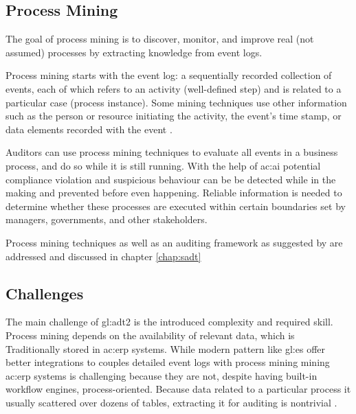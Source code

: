 

\subsection{Process Mining}\label{sec:psmin}

The goal of process mining is to discover, monitor, and improve real (not assumed) processes by extracting knowledge from event logs. 

Process mining starts with the event log: a sequentially recorded collection of events, each of which refers to an activity (well-defined step) and is related to a particular case (process instance). Some mining techniques use other information such as the person or resource initiating the activity, the event's time stamp, or data elements recorded with the event \citep{5427384}.

Auditors can use process mining techniques to evaluate all events in a business process, and do so while it is still running. With the help of \gls{ac:ai} potential compliance violation and suspicious behaviour can be be detected while in the making and prevented before even happening. Reliable information is needed to determine whether these processes are executed within certain boundaries set by managers, governments, and other stakeholders. 

Process mining techniques as well as an auditing framework as suggested by \citep{5427384} are addressed and discussed in chapter \ref{chap:sadt}

\subsection{Challenges}


The main challenge of \gls{gl:adt2} is the introduced complexity and required skill. Process mining depends on the availability of relevant data, which is Traditionally stored in \gls{ac:erp} systems. While modern pattern like \gls{gl:es} offer better integrations to couples detailed event logs with process mining mining \gls{ac:erp} systems is challenging because they are not, despite having built-in workflow engines, process-oriented. Because data related to a particular process it usually scattered over dozens of tables, extracting it for auditing is nontrivial \citep{5427384}.

